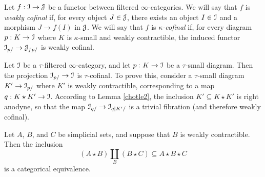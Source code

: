 \begin{definition}
Let $f: \operatorname{\mathcal{I}} \rightarrow \operatorname{\mathcal{J}}$ be a functor between filtered $\infty$-categories. We will say
that $f$ is {\it weakly cofinal} if, for every object $J \in \operatorname{\mathcal{J}}$, there exists an object
$I \in \operatorname{\mathcal{I}}$ and a morphism $J \rightarrow f(I)$ in $\operatorname{\mathcal{J}}$. We will say that $f$ is {\it $\kappa$-cofinal} if, for every diagram $p: K \rightarrow \operatorname{\mathcal{I}}$ where $K$ is $\kappa$-small and weakly contractible, the induced functor $\operatorname{\mathcal{I}}_{p/} \rightarrow \operatorname{\mathcal{J}}_{f  p/}$ is weakly cofinal.
\end{definition}

\begin{example}\label{easex}
Let $\operatorname{\mathcal{I}}$ be a $\tau$-filtered $\infty$-category, and let $p: K \rightarrow \operatorname{\mathcal{I}}$ be a $\tau$-small diagram. Then the projection $\operatorname{\mathcal{I}}_{p/} \rightarrow \operatorname{\mathcal{I}}$ is $\tau$-cofinal. To prove this, consider
a $\tau$-small diagram $K' \rightarrow \operatorname{\mathcal{I}}_{p/}$ where $K'$ is weakly contractible, corresponding to a map $q: K \star K' \rightarrow \operatorname{\mathcal{I}}$. According to Lemma \ref{chotle2}, the inclusion
$K' \subseteq K \star K'$ is right anodyne, so that the map
$\operatorname{\mathcal{I}}_{q/} \rightarrow \operatorname{\mathcal{I}}_{q|K'/}$ is a trivial fibration (and therefore weakly cofinal).
\end{example}

\begin{lemma}\label{storuse}
Let $A$, $B$, and $C$ be simplicial sets, and suppose that $B$ is weakly contractible. Then the inclusion
$$ (A \star B) \coprod_{B} (B \star C) \subseteq A \star B \star C$$
is a categorical equivalence.
\end{lemma}

